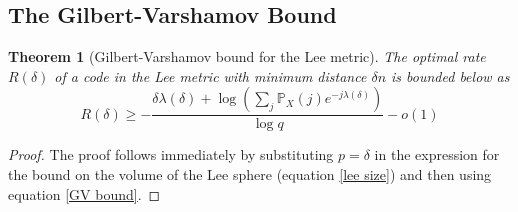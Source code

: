 \documentclass[conference,letterpaper]{IEEEtran}
\newtheorem{theorem}{Theorem}
\newtheorem{lemma}[theorem]{Lemma}
\begin{document}
\subsection{The Gilbert-Varshamov Bound}

\begin{theorem}[Gilbert-Varshamov bound for the Lee metric] The optimal rate $R(\delta)$ of a code in the Lee metric with minimum distance $\delta n$ is bounded below as
\begin{equation}
    R(\delta) \geq -\frac{{\delta} \lambda(\delta) + \log \left(\sum_j \mathbb{P}_X(j) e^{-j \lambda(\delta)}\right)}{\log q} - o(1)
\end{equation}
\end{theorem}
\begin{proof}
The proof follows immediately by substituting $p = {\delta}$ in the expression for the bound on the volume of the Lee sphere (equation \cref{lee size}) and then using equation \cref{GV bound}.
\end{proof}
\end{document}
